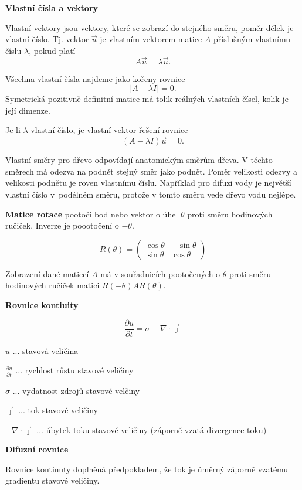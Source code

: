 \documentclass{article}
\begin{document}
\begin{multicols}{3}
\vfill\null

\columnbreak

\textbf{Vlastní čísla a vektory}

Vlastní vektory jsou vektory, které se zobrazí do stejného směru, poměr délek je vlastní číslo. Tj. vektor $\vec u$ je vlastním vektorem matice $A$ příslušným vlastnímu číslu $\lambda$, pokud platí $$A\vec u=\lambda\vec u.$$

Všechna vlastní čísla najdeme jako kořeny rovnice $$|A-\lambda I|=0.$$ Symetrická pozitivně definitní matice má tolik reálných vlastních čísel, kolik je její dimenze. 

Je-li $\lambda$ vlastní číslo, je vlastní vektor řešení rovnice $$(A-\lambda I)\vec u=0.$$

Vlastní směry pro dřevo odpovídají anatomickým směrům dřeva. V těchto směrech má odezva na podnět stejný směr jako podnět. Poměr velikosti odezvy a velikosti podnětu je roven vlastnímu číslu. Například pro difuzi vody je největší vlastní číslo v~podélném směru, protože v tomto směru vede dřevo vodu nejlépe.

\textbf{Matice rotace} pootočí bod nebo vektor o úhel $\theta$ proti směru hodinových ručiček. Inverze je poootočení o $-\theta$.

$$R(\theta)=
\begin{pmatrix}
  \cos\theta & -\sin \theta\\
  \sin\theta & \cos\theta
\end{pmatrix}$$

Zobrazení dané maticcí $A$ má v souřadnicích pootočených o $\theta$ proti směru hodinových ručiček matici $R(-\theta)AR(\theta)$.

\vfill\null

\columnbreak

\textbf{Rovnice kontiuity}


$${\frac{\partial u}{\partial t}=\sigma -\nabla\cdot \vec \jmath}$$

$u$ ... stavová veličina

$\frac{\partial u}{\partial t}$ ... rychlost růstu stavové veličiny

$\sigma$ ... vydatnost zdrojů stavové velčiny

$\vec\jmath$ ... tok stavové veličiny

$-\nabla\cdot \vec \jmath$ ... úbytek toku stavové veličiny (záporně vzatá divergence toku)

\textbf{Difuzní rovnice}

Rovnice kontinuty doplněná předpokladem, že tok je úměrný záporně vzatému gradientu stavové veličiny.


\end{multicols}
\end{document}
